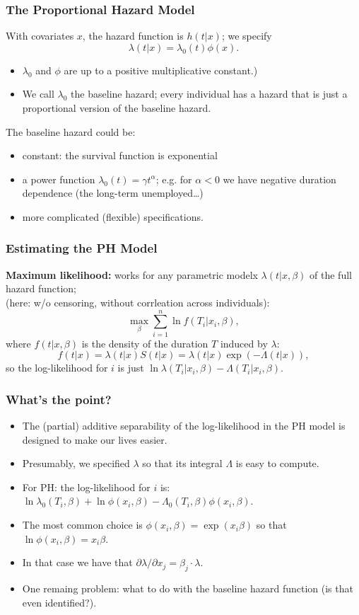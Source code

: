 \documentclass[aspectratio=169]{beamer}
\begin{document}
\begin{frame}
\frametitle{The Proportional Hazard  Model}
With covariates $x$, the hazard function is $h(t \vert x)$; we specify
\[
\lambda(t \vert x)=\lambda_0(t)\phi(x).
\]
\begin{itemize}
\item $\lambda_0$ and $\phi$ are up to a positive multiplicative constant.)
\item  We call $\lambda_0$ the \alert{ baseline hazard}; every individual has
a hazard that is just a proportional version of the baseline hazard.
\end{itemize}
The baseline hazard could be:
\begin{itemize}
\item constant: the survival function is exponential
\item a power function $\lambda_0(t)=\gamma t^{\alpha}$; e.g. for
$\alpha<0 $ we have \alert{negative duration dependence} (the
long-term unemployed\ldots)
\item more complicated (flexible) specifications.
\end{itemize}
\end{frame}



\begin{frame}
\frametitle{Estimating the PH Model}
{\bf Maximum likelihood:} works for any parametric modelx
$\lambda(t \vert x,\beta)$ of the full hazard function;\\
(here: w/o censoring, without corrleation across individuals):
\[
\max_{\beta} \sum_{i=1}^n \ln f(T_i \vert x_i,\beta),
\]
where $f(t \vert x,\beta)$ is the density of the duration $T$ induced by
$\lambda$:
\[
f(t \vert x)=\lambda(t \vert x)S(t \vert x)=\lambda(t \vert x)\exp(-\Lambda(t \vert x)),
\]
so the log-likelihood for $i$ is just $\ln
\lambda(T_i \vert x_i,\beta)-\Lambda(T_i \vert x_i,\beta)$.
\end{frame}

\begin{frame}
\frametitle{What's the point?}
\begin{itemize}
\item The (partial) additive separability of the log-likelihood in the PH model is designed to make our lives easier.
\item Presumably, we specified $\lambda$ so that its integral $\Lambda$ is easy to
compute. 
\item For PH: the log-likelihood for $i$ is:\\
$\ln \lambda_0(T_i,\beta)+\ln\phi(x_i,\beta)-\Lambda_0(T_i,\beta)\phi(x_i,\beta)$.
\item The most common choice is $\phi(x_i,\beta) = \exp(x_i \beta)$ so that $\ln\phi(x_i,\beta) = x_i \beta$.
\item In that case we have that $\partial \lambda/ \partial x_j = \beta_j \cdot \lambda$.
\item One remaing problem: what to do with the baseline hazard function (is that even identified?).
\end{itemize}
\end{frame}
\end{document}

